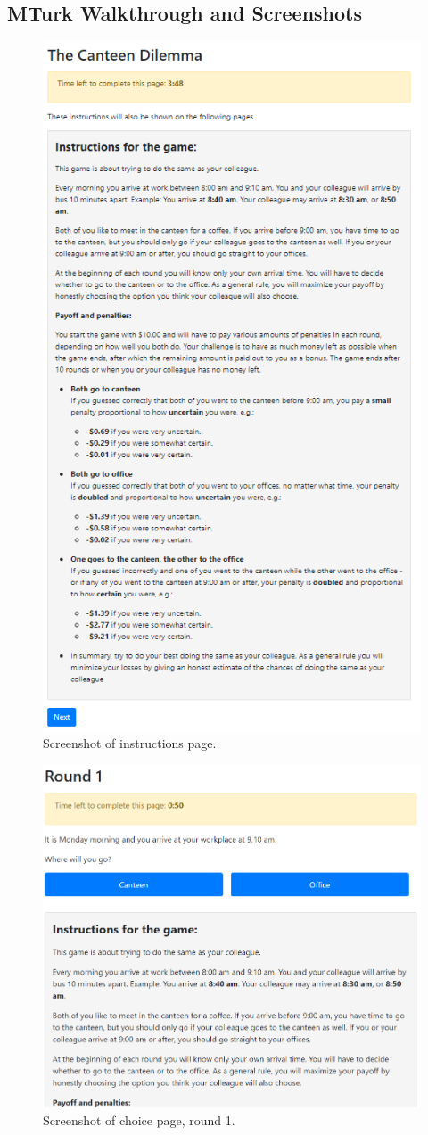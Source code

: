 \documentclass[a4paper,superscriptaddress,nofootinbib]{revtex4}
\begin{document}
\subsection*{MTurk Walkthrough and Screenshots}
\begin{figure} %
\centering\includegraphics[width=0.8\linewidth]{screenshot_instructions}
\caption{Screenshot of instructions page.}
\label{fig:instructions}
\end{figure}
\begin{figure} %
\centering\includegraphics[width=0.8\linewidth]{screenshot_round1}
\caption{Screenshot of choice page, round 1.}
\label{fig:round1}
\end{figure}
\end{document}

